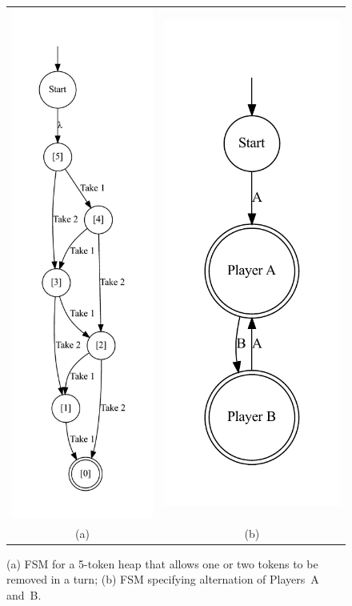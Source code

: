 \documentclass[conference]{IEEEtran}
\begin{document}
\begin{figure}
    \centering
    \begin{tabular}{cc}
    \includegraphics[width=0.3\linewidth]{figures/nimexample/heapFSM.pdf} &
    \includegraphics[width=0.3\linewidth]{figures/nimexample/playerFSM.pdf} \\
    (a) & (b)
    \end{tabular}
    \caption{(a) FSM for a 5-token heap that allows one or two tokens to be removed in a turn; (b) FSM specifying alternation of Players~A and~B.}
    \label{fig:nimHeapFSM} 
\end{figure}
\end{document}

